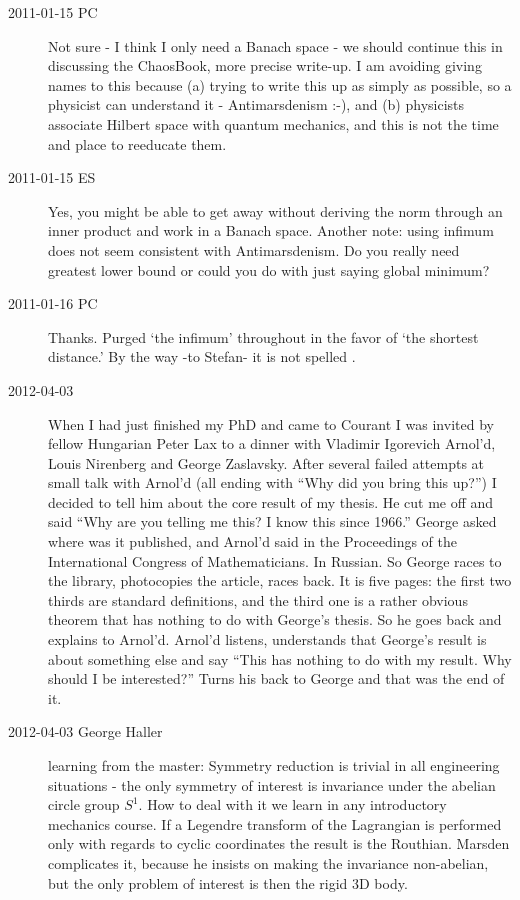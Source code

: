 \begin{description}
\item[2011-01-15 PC]
Not sure - I think I only need a Banach space - we should continue this
in discussing the ChaosBook, more precise write-up. I am avoiding giving
names to this because (a) trying to write this up as simply as possible,
so a physicist can understand it - Antimarsdenism :-), and (b) physicists
associate Hilbert space with quantum mechanics, and this is not the time
and place to reeducate them.

\item[2011-01-15 ES]
Yes, you might be able to get away without deriving the norm through an
inner product and work in a Banach space. Another note: using infimum
does not seem consistent with Antimarsdenism. Do you really need greatest
lower bound or could you do with just saying global minimum?

\item[2011-01-16 PC] Thanks. Purged `the infimum' throughout in the favor of
`the shortest distance.' By the way -to Stefan- it is not spelled
.

\item[2012-04-03 ] When I
had just finished my PhD and came to Courant I was invited by fellow
Hungarian Peter Lax to a dinner with Vladimir Igorevich Arnol'd, Louis
Nirenberg and George Zaslavsky. After several failed attempts at small
talk with Arnol'd (all ending with ``Why did you bring this up?'') I
decided to tell him about the core result of my thesis. He cut me off and
said ``Why are you telling me this? I know this since 1966.'' George
asked where was it published, and Arnol'd said in the Proceedings of the
International Congress of Mathematicians. In Russian. So George races to
the library, photocopies the article, races back. It is five pages:
the first two thirds are standard definitions, and the third one is a rather
obvious theorem that has nothing to do with George's thesis. So he goes
back and explains to Arnol'd. Arnol'd listens, understands that George's
result is about something else and say ``This has nothing to do with my
result. Why should I be interested?'' Turns his back to George and that
was the end of it.

\item[2012-04-03 George Haller] learning from the master:       \toCB
Symmetry reduction is trivial in all engineering situations - the only
symmetry of interest is invariance under the abelian circle group $S^1$.
How to deal with it we learn in any introductory mechanics course. If a
Legendre transform of the Lagrangian is performed only with regards to
cyclic coordinates
the result is the Routhian. Marsden complicates it, because he insists on
making the invariance non-abelian, but the only problem of interest is
then the rigid 3D body.


\end{description}
